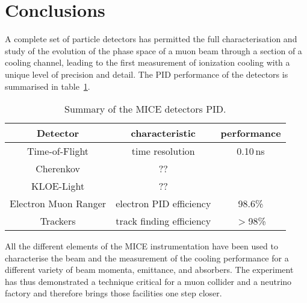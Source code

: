 \graphicspath{{80-Conclusions/Figures/}}

\section{Conclusions}
\label{Sect:Conclusions}

A complete set of particle detectors has permitted the full characterisation and study of the evolution of the phase space of a muon beam through a section of a cooling channel, leading to the first measurement of ionization cooling with a unique level of precision and detail.
The PID performance of the detectors is summarised in table~\ref{tab:pid}.


\begin{table}[htb!]
	\centering
	\begin{tabular}{c|c|c}
	  Detector              & characteristic            & performance \\
		\hline
    Time-of-Flight        & time resolution           & 0.10\,ns \\
    Cherenkov             & ?? &\\
    KLOE-Light            & ?? &\\
    Electron Muon Ranger  & electron PID efficiency   & 98.6\%  \\
    Trackers              & track finding efficiency  & $>$98\% \\
  \end{tabular}
	\caption{Summary of the MICE detectors PID.}
	\label{tab:pid}
\end{table}

All the different elements of the MICE instrumentation have been used to characterise the beam and the measurement of the cooling performance for a different variety of beam momenta, emittance, and absorbers.
The experiment has thus demonstrated a technique critical for a muon collider and a neutrino factory and therefore brings those facilities one step closer.
